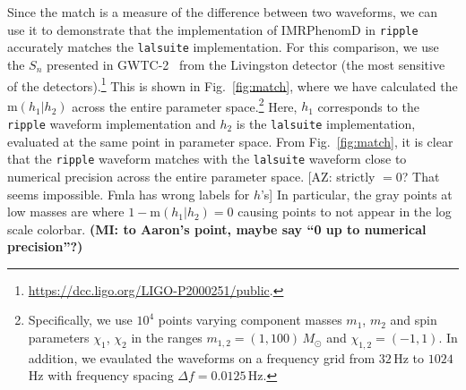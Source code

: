 \documentclass[twocolumn]{aastex631}
\newcommand{\ripple}{\texttt{ripple}\xspace}
\newcommand{\lalsuite}{\texttt{lalsuite}\xspace}
\newcommand{\AZ}[1]{{\color{Burnt}[AZ: #1]}}
\newcommand{\mi}[1]{\textbf{\color{teal}(MI: #1)}}
\begin{document}
Since the match is a measure of the difference between two waveforms, we can use it to demonstrate that the implementation of IMRPhenomD in \ripple accurately matches the \lalsuite implementation. For this comparison, we use the $S_n$  presented in GWTC-2~\citep{LIGOScientific:2020ibl} from the Livingston detector (the most sensitive of the detectors).\footnote{
    \url{https://dcc.ligo.org/LIGO-P2000251/public}.
    }
This is shown in Fig.~\ref{fig:match}, where we have calculated the $\mathrm{m}(h_1|h_2)$ across the entire parameter space.\footnote{
    Specifically, we use $10^4$ points varying component masses $m_1$, $m_2$ and spin parameters $\chi_1$, $\chi_2$ in the ranges $m_{1,2} = (1,100)\,M_{\odot}$ and $\chi_{1,2} = (-1,1)$. In addition, we evaulated the waveforms on a frequency grid from $32\,$Hz to $1024\,$Hz with frequency spacing $\Delta f = 0.0125 \,$Hz.
}
Here, $h_1$ corresponds to the \ripple waveform implementation and $h_2$ is the \lalsuite implementation, evaluated at the same point in parameter space.
From Fig.~\ref{fig:match}, it is clear that the \ripple waveform matches with the \lalsuite waveform close to numerical precision across the entire parameter space.
\AZ{strictly $=0$? That seems impossible. Fmla has wrong labels for $h$'s}
In particular, the gray points at low masses are where $1-\mathrm{m}(h_1|h_2)=0$ causing points to not appear in the log scale colorbar.
\mi{to Aaron's point, maybe say ``0 up to numerical precision''?}
\end{document}
